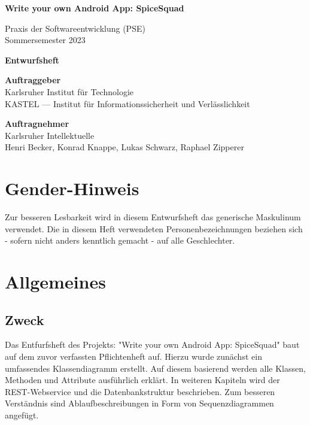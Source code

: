 \documentclass[parskip=full]{scrartcl}
\begin{document}


\begin{titlepage}
    \begin{center}
        \begin{Huge}
            {\textbf{Write your own Android App: SpiceSquad}}
        \end{Huge}
        \vspace{12px}

        Praxis der Softwareentwicklung (PSE)\\
        Sommersemester 2023\\
        \vspace{150px}

        \begin{Huge}
            {\textbf{Entwurfsheft}}
        \end{Huge}
        \vspace{12px}

        \textbf{Auftraggeber}\\
        Karlsruher Institut für Technologie\\
        KASTEL — Institut für Informationssicherheit und Verlässlichkeit\\
        \vspace{330px}

        \textbf{Auftragnehmer}\\
        Karlsruher Intellektuelle\\
        Henri Becker, Konrad Knappe, Lukas Schwarz, Raphael Zipperer\\
    \end{center}
\end{titlepage}

\tableofcontents
\newpage

\section*{Gender-Hinweis}
Zur besseren Lesbarkeit wird in diesem Entwurfsheft das generische Maskulinum verwendet.
Die in diesem Heft verwendeten Personenbezeichnungen beziehen sich - sofern nicht anders kenntlich gemacht - auf alle Geschlechter.
\newpage

\section{Allgemeines}
\subsection{Zweck}
Das Entfurfsheft des Projekts: "Write your own Android App: SpiceSquad" baut auf dem zuvor verfassten Pflichtenheft auf.
Hierzu wurde zunächst ein umfassendes Klassendiagramm erstellt. Auf diesem basierend werden alle Klassen, Methoden und Attribute ausführlich erklärt.
In weiteren Kapiteln wird der REST-Webservice und die Datenbankstruktur beschrieben. Zum besseren Verständnis sind Ablaufbeschreibungen in Form von Sequenzdiagrammen angefügt.
\end{document}
